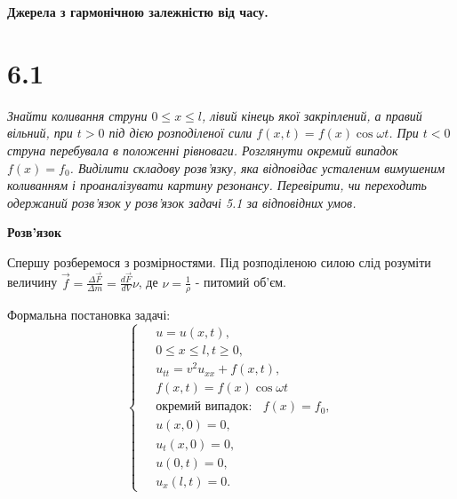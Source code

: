 

%



\textbf{\large Джерела з гармонічною залежністю від часу.}

\section[Задача №6.1]{6.1}

\textit{Знайти коливання струни $0 \leq x \leq l$, лівий кінець якої закріплений, а правий вільний, при $t > 0$ під дією розподіленої сили $f(x,t) = f(x)\cos\omega t$. При $t < 0$ струна перебувала в положенні рівноваги. Розглянути окремий випадок $f(x) = f_0$. Виділити складову розв’язку, яка відповідає усталеним вимушеним коливанням і проаналізувати картину резонансу. Перевірити, чи переходить одержаний розв’язок у розв’язок задачі 5.1 за відповідних умов.}

\begin{center}
    \large{\textbf{Розв'язок}}
\end{center}

\noindent Спершу розберемося з розмірностями. Під розподіленою силою слід розуміти величину $\vec{f}=\frac{\Delta \vec{F}}{\Delta m} = \frac{d\vec{F}}{dV} \nu$, де $\nu =\frac 1\rho$ - питомий об'єм. 

\noindent Формальна постановка задачі:
\begin{equation} \label{cond6,1}
    \left\{ \begin{aligned} %
            \;&u = u(x,t), \\
            &0 \leq x \leq l, t \geq 0, \\
            &u_{tt}=v^2u_{xx}+f(x,t), \\
            &f(x,t)=f(x)\cos\omega t\\
            &\text{окремий випадок: }\;\; f(x)= f_0,\\
            &u(x,0)=0,\\
            &u_t(x,0)=0,\\
            &u(0,t) =0, \\
            &u_x(l,t) =0 . 
    \end{aligned} \right.
\end{equation}

